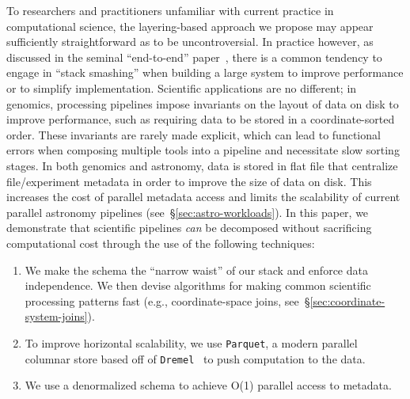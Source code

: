 \documentclass{sig-alternate}
\begin{document}
To researchers and practitioners unfamiliar with current practice in computational science, the layering-based approach
we propose may appear sufficiently straightforward as to be uncontroversial. In practice however, as discussed in the
seminal ``end-to-end'' paper~\cite{saltzer84}, there is a common tendency to engage in ``stack smashing'' when building
a large system to improve performance or to simplify implementation. Scientific applications are no different; in genomics,
processing pipelines impose invariants on the layout of data on disk to improve performance, such as requiring data to be
stored in a coordinate-sorted order. These invariants are rarely made explicit, which can lead to functional errors when
composing multiple tools into a pipeline and necessitate slow sorting stages. In both genomics and astronomy, data is
stored in flat file that centralize file/experiment metadata in order to improve the size of data on disk. This increases the
cost of parallel metadata access and limits the scalability of current parallel astronomy pipelines
(see~\S\ref{sec:astro-workloads}). In this paper, we demonstrate that scientific pipelines \emph{can} be decomposed
without sacrificing computational cost through the use of the following techniques:

\begin{enumerate}
\item We make the schema the ``narrow waist'' of our stack and enforce data independence. We then
devise algorithms for making common scientific processing patterns fast (e.g., coordinate-space joins,
see~\S\ref{sec:coordinate-system-joins}).
\item To improve horizontal scalability, we use \texttt{Parquet}, a modern parallel columnar store based off of
\texttt{Dremel}~\cite{melnik10} to push computation to the data.
\item We use a denormalized schema to achieve O(1) parallel access to metadata.
\end{enumerate}
\end{document}
